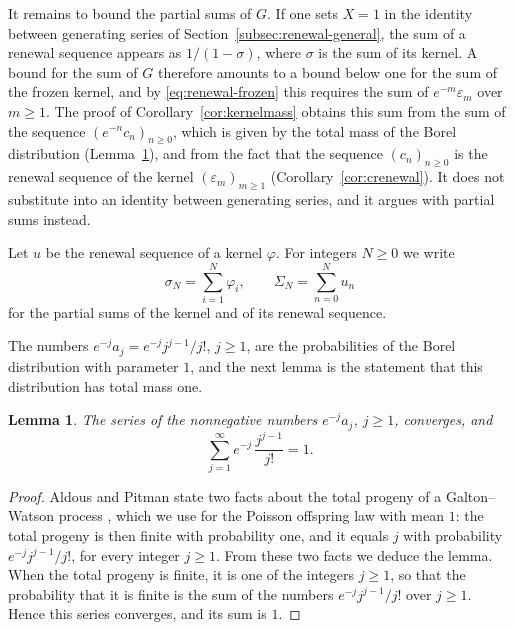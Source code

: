 \documentclass{amsart}
\makeatletter
\newtheorem{lemma}[theorem]{Lemma}
\theoremstyle{definition}
\theoremstyle{remark}
\numberwithin{equation}{section}
\def\subsection{\@startsection{subsection}{2}\z@{.5\linespacing\@plus.7\linespacing}{-.5em}{\normalfont\bfseries\boldmath}}
\makeatother
\begin{document}
\subsection{Total masses}\label{subsec:renewal-mass}

It remains to bound the partial sums of $G$. If one sets $X=1$ in the
identity between generating series of Section~\ref{subsec:renewal-general},
the sum of a renewal sequence appears as $1/(1-\sigma)$, where $\sigma$ is
the sum of its kernel. A bound for the sum of $G$ therefore amounts to a
bound below one for the sum of the frozen kernel, and by
\eqref{eq:renewal-frozen} this requires the sum of
$e^{-m}\varepsilon_m$ over $m\ge1$. The proof of
Corollary~\ref{cor:kernelmass} obtains this sum from the sum of the sequence
$(e^{-n}c_n)_{n\ge0}$, which is given by the total mass of the Borel
distribution (Lemma~\ref{lem:borelmass}), and from the fact that the
sequence $(c_n)_{n\ge0}$ is the renewal sequence of the kernel
$(\varepsilon_m)_{m\ge1}$ (Corollary~\ref{cor:crenewal}). It does not
substitute into an identity between generating series, and it argues with
partial sums instead.

Let $u$ be the renewal sequence of a kernel $\varphi$. For integers $N\ge0$
we write
\[
\sigma_N=\sum_{i=1}^{N}\varphi_i,\qquad\Sigma_N=\sum_{n=0}^{N}u_n
\]
for the partial sums of the kernel and of its renewal sequence.

The numbers $e^{-j}a_j=e^{-j}j^{j-1}/j!$, $j\ge1$, are the probabilities of
the Borel distribution with parameter $1$, and the next lemma is the
statement that this distribution has total mass one.

\begin{lemma}\label{lem:borelmass}
The series of the nonnegative numbers $e^{-j}a_j$, $j\ge1$, converges, and
\[
\sum_{j=1}^{\infty}e^{-j}\,\frac{j^{j-1}}{j!}=1 .
\]
\end{lemma}

\begin{proof}
Aldous and Pitman state two facts about the total progeny of a
Galton--Watson process \cite[Section~2.2 and~(10)]{aldouspitman1998}, which
we use for the Poisson offspring law with mean $1$: the total progeny is
then finite with probability one, and it equals $j$ with probability
$e^{-j}j^{j-1}/j!$, for every integer $j\ge1$. From these two facts we
deduce the lemma. When the total progeny is finite, it is one of the
integers $j\ge1$, so that the probability that it is finite is the sum of
the numbers $e^{-j}j^{j-1}/j!$ over $j\ge1$. Hence this series converges,
and its sum is $1$.
\end{proof}
\end{document}
